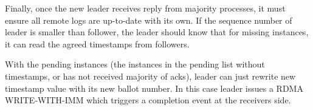 Finally, once the new leader receives reply from majority processes, it must
ensure all remote logs are up-to-date with its own. If the sequence number of
leader is smaller than follower, the leader should know that for missing
instances, it can read the agreed timestamps from followers.

With the pending instances (the instances in the pending list without
timestamps, or has not received majority of acks), leader can just rewrite new
timestamp value with its new ballot number. In this case leader issues a RDMA
WRITE-WITH-IMM which triggers a completion event at the receivers side.



